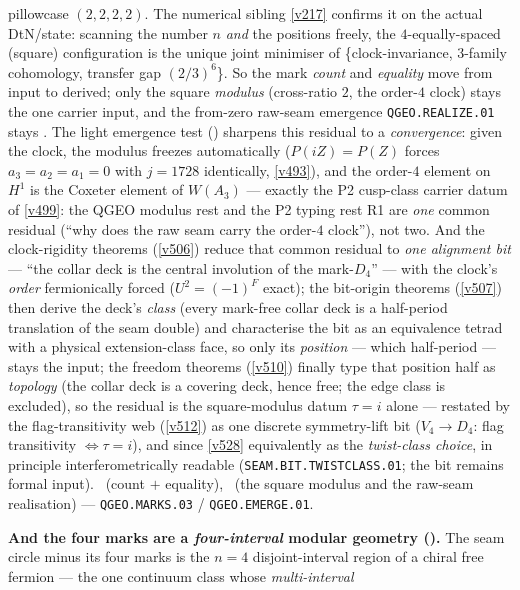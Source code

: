\documentclass[11pt,a4paper]{article}
\begin{document}
\begin{keybox}
pillowcase $(2,2,2,2)$. The numerical sibling \vref{v217} confirms it on the actual DtN/state: scanning the
number $n$ \emph{and} the positions freely, the $4$-equally-spaced (square) configuration is the unique joint
minimiser of \{clock-invariance, $3$-family cohomology, transfer gap $(2/3)^6$\}. So the mark \emph{count}
and \emph{equality} move from input to derived; only the square \emph{modulus} (cross-ratio $2$, the order-$4$
clock) stays the one carrier input, and the from-zero raw-seam emergence \texttt{QGEO.REALIZE.01} stays \mO.
The light emergence test () sharpens this residual to a
\emph{convergence}: given the clock, the modulus freezes automatically ($P(iZ)=P(Z)$ forces
$a_3=a_2=a_1=0$ with $j=1728$ identically, \vref{v493}), and the order-$4$ element on $H^1$ is the
Coxeter element of $W(A_3)$ --- exactly the P2 cusp-class carrier datum of \vref{v499}: the QGEO
modulus rest and the P2 typing rest R1 are \emph{one} common residual (``why does the raw seam carry
the order-$4$ clock''), not two. And the clock-rigidity theorems (\vref{v506}) reduce that common
residual to \emph{one alignment bit} --- ``the collar deck is the central involution of the
mark-$D_4$'' --- with the clock's \emph{order} fermionically forced ($U^2=(-1)^F$ exact); the
bit-origin theorems (\vref{v507}) then derive the deck's \emph{class} (every mark-free collar deck
is a half-period translation of the seam double) and characterise the bit as an equivalence tetrad
with a physical extension-class face, so only its \emph{position} --- which half-period --- stays
the input; the freedom theorems (\vref{v510}) finally type that position half as \emph{topology}
(the collar deck is a covering deck, hence free; the edge class is excluded), so the residual is the
square-modulus datum $\tau=i$ alone --- restated by the flag-transitivity web (\vref{v512}) as one
discrete symmetry-lift bit ($V_4\to D_4$: flag transitivity $\iff\tau=i$), and since \vref{v528}
equivalently as the \emph{twist-class choice}, in principle interferometrically readable
(\texttt{SEAM.BIT.TWISTCLASS.01}; the bit remains formal input).
\mE\ (count $+$ equality), \mO\ (the square modulus and the raw-seam realisation) --- \texttt{QGEO.MARKS.03} /
\texttt{QGEO.EMERGE.01}.
\par\smallskip\noindent\textbf{And the four marks are a \emph{four-interval} modular geometry
().} The seam circle minus its four marks is the $n{=}4$
disjoint-interval region of a chiral free fermion --- the one continuum class whose \emph{multi-interval}

\end{keybox}
\end{document}

